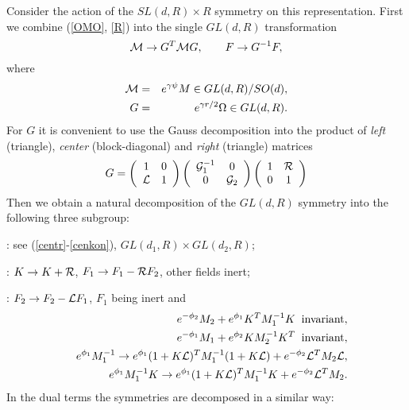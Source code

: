 \documentclass[a4paper,12pt]{article}
\begin{document}
\begin{appendix}
Consider the action of the $SL(d,R)\times R$  symmetry on this
representation. First we combine (\ref{OMO}, \ref{R}) into the
single $GL(d,R)$ transformation
\begin{equation}\label{190}
{\cal M} \to G^T {\cal M} G, \qquad F \to G^{-1} F,
\end{equation}
where
\begin{eqnarray}
{\cal M} &=& e^{\gamma\psi} M \in GL(d,R)/SO(d), \nonumber \\
G &=& e^{\gamma r/2} \Omega \in GL(d,R).
\end{eqnarray}
For $G$ it is convenient to use the Gauss decomposition into the
product of {\it left} (triangle), {\it center} (block-diagonal)
and {\it right} (triangle) matrices
\begin{equation}\label{193}
G = \left( \begin{array}{cc}
  1 & 0 \\ {\cal L} & 1 \end{array} \right)
  \left(\begin{array}{cc}
  {\cal G}_1^{-1} & 0 \\ 0 & {\cal G}_2 \end{array} \right)
  \left(\begin{array}{cc}
  1 & {\cal R} \\ 0 & 1 \end{array} \right)
\end{equation}
Then we obtain a natural decomposition of the $GL(d,R)$ symmetry
into the following three subgroup:

\smallskip
{}: see (\ref{centr}-\ref{cenkon}),
$GL(d_1,R)\times GL(d_2,R)$;

\smallskip
{}: $K \to K + {\cal R}$, $F_1 \to F_1 -
{\cal R} F_2$, other fields inert;

\smallskip
{}: $F_2 \to F_2 - {\cal L} F_1$, $F_1$ being
inert and
\begin{eqnarray}\label{st}
&& e^{-\phi_2} M_2 + e^{\phi_1} K^T M_1^{-1} K \;\; \hbox{invariant},\\
&& e^{-\phi_1} M_1 + e^{\phi_2} K M_2^{-1} K^T \;\; \hbox{invariant},\\
&& e^{\phi_1} M_1^{-1} \to e^{\phi_1} (1 + K{\cal L})^T M_1^{-1}
(1 + K{\cal L}) + e^{-\phi_2} {\cal L}^T M_2 {\cal L}, \\
&& e^{\phi_1} M_1^{-1} K \to e^{\phi_1}(1 + K{\cal L})^T M_1^{-1}
K + e^{-\phi_2} {\cal L}^T M_2. \label{fn}
\end{eqnarray}
In the dual terms the symmetries are decomposed in a similar way:


\end{appendix}
\end{document}
